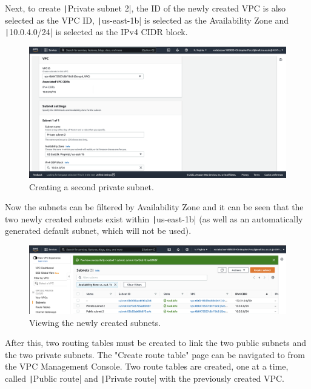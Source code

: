 Next, to create \texttt|Private subnet 2|, the ID of the newly created VPC is also selected as the VPC ID,
\texttt|us-east-1b| is selected as the Availability Zone and \texttt|10.0.4.0/24| is selected as the
IPv4 CIDR block.

\begin{figure}[!htbp]
    \centering
    \includegraphics[width=\textwidth]{resources/vpc/routes/vpc-private-subnet-2}
    \caption{Creating a second private subnet.}
    \label{fig:vpc-private-subnet-2}
\end{figure}

Now the subnets can be filtered by Availability Zone and it can be seen that the two newly created subnets exist within
\texttt|us-east-1b| (as well as an automatically generated default subnet, which will not be used).

\begin{figure}[!htbp]
    \centering
    \includegraphics[width=\textwidth]{resources/vpc/routes/vpc-subnets-2}
    \caption{Viewing the newly created subnets.}
    \label{fig:vpc-subnets-2}
\end{figure}

After this, two routing tables must be created to link the two public subnets and the two private subnets.
The "Create route table" page can be navigated to from the VPC Management Console.
Two route tables are created, one at a time, called \texttt|Public route| and \texttt|Private route|
with the previously created VPC\@.

